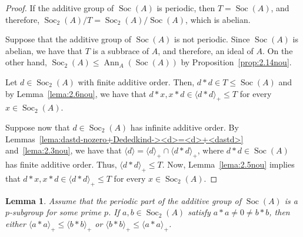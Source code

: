 \documentclass[12pt, a4paper, english]{article}
\newtheorem{lema}[teorema]{Lemma}
\theoremstyle{definition}
\DeclareMathOperator{\Ann}{Ann}
\DeclareMathOperator{\Soc}{Soc}
\begin{document}
\begin{proof}
If the additive group of $\Soc(A)$ is periodic, then $T = \Soc(A)$,  and therefore, $\Soc_2(A)/T = \Soc_2(A)/\Soc(A)$, which is abelian.

Suppose that the additive group of $\Soc(A)$ is not periodic. Since $\Soc(A)$ is abelian, we have that $T$ is  a subbrace of $A$, and therefore, an ideal of $A$. On the other hand, $\Soc_2(A) \leq \Ann_A(\Soc(A))$ by Proposition~\ref{prop:2.14nou}. 

Let $d\in \Soc_2(A)$ with finite additive order. Then, $d \ast d \in T \leq \Soc(A)$ and by Lemma~\ref{lema:2.6nou}, we have that $d\ast x, x \ast d \in \langle d \ast d \rangle_+ \leq T$ for every $x \in \Soc_2(A)$. 

Suppose now that $d\in \Soc_2(A)$ has infinite additive order. By Lemmas~\ref{lema:dastd-nozero+Dededkind-><d>=<d>+<dastd>} and~\ref{lema:2.3nou}, we have that $\langle d \rangle = \langle d \rangle_+ \cap \langle d \ast d \rangle_+$, where $d \ast d \in \Soc(A)$ has finite additive order. Thus, $\langle d \ast d \rangle_+\leq T$. Now, Lemma~\ref{lema:2.5nou} implies that $d\ast x, x\ast d \in \langle d \ast d \rangle_+ \leq T$ for every $x\in \Soc_2(A)$.
\end{proof}


\begin{lema}
\label{lema:2.9nou}
Assume that the periodic part of the additive group of $\Soc(A)$ is a $p$-subgroup for some prime $p$. If $a, b \in \Soc_2(A)$ satisfy $a \ast a \neq 0 \neq b \ast b$, then either $\langle a \ast a \rangle_+ \leq \langle b \ast b \rangle_+$ or $\langle b \ast b \rangle_+ \leq \langle a \ast a \rangle_+$.
\end{lema}
\end{document}
